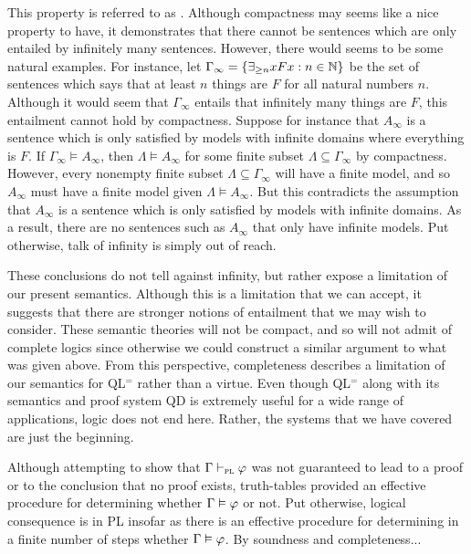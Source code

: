 This property is referred to as .
Although compactness may seems like a nice property to have, it demonstrates that there cannot be sentences which are only entailed by infinitely many sentences.
However, there would seems to be some natural examples.
For instance, let $\Gamma_\infty=\lbrace\exists_{\geq n}xFx:n\in\mathbb{N}\rbrace$ be the set of sentences which says that at least $n$ things are $F$ for all natural numbers $n$. 
Although it would seem that $\Gamma_\infty$ entails that infinitely many things are $F$, this entailment cannot hold by compactness.
Suppose for instance that $A_\infty$ is a sentence which is only satisfied by models with infinite domains where everything is $F$.
If $\Gamma_\infty\models A_\infty$, then $\Lambda\models A_\infty$ for some finite subset $\Lambda\subseteq\Gamma_\infty$ by compactness.
However, every nonempty finite subset $\Lambda\subseteq\Gamma_\infty$ will have a finite model, and so $A_\infty$ must have a finite model given $\Lambda\models A_\infty$. 
But this contradicts the assumption that $A_\infty$ is a sentence which is only satisfied by models with infinite domains.
As a result, there are no sentences such as $A_\infty$ that only have infinite models. %
Put otherwise, talk of infinity is simply out of reach.

These conclusions do not tell against infinity, but rather expose a limitation of our present semantics.
Although this is a limitation that we can accept, it suggests that there are stronger notions of entailment that we may wish to consider.
These semantic theories will not be compact, and so will not admit of complete logics since otherwise we could construct a similar argument to what was given above.
From this perspective, completeness describes a limitation of our semantics for QL$^=$ rather than a virtue.
Even though QL$^=$ along with its semantics and proof system QD is extremely useful for a wide range of applications, logic does not end here. 
Rather, the systems that we have covered are just the beginning.



Although attempting to show that $\Gamma \vdash_{\textsc{pl}} \varphi$ was not guaranteed to lead to a proof or to the conclusion that no proof exists, truth-tables provided an effective procedure for determining whether $\Gamma\vDash\varphi$ or not. 
Put otherwise, logical consequence is  in PL insofar as there is an effective procedure for determining in a finite number of steps whether $\Gamma \vDash \varphi$.
By soundness and completeness... %

